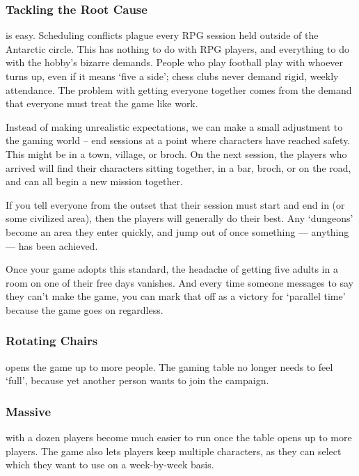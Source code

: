 \begin{multicols}{2}
\subsubsection{Tackling the Root Cause}
is easy.
Scheduling conflicts plague every RPG session held outside of the Antarctic circle.
This has nothing to do with RPG players, and everything to do with the hobby's bizarre demands.
People who play football play with whoever turns up, even if it means `five a side'; chess clubs never demand rigid, weekly attendance.
The problem with getting everyone together comes from the demand that everyone must treat the game like work.

Instead of making unrealistic expectations, we can make a small adjustment to the gaming world -- end sessions at a point where characters have reached safety.
This might be in a town, \gls{village}, or \gls{broch}.
On the next session, the players who arrived will find their characters sitting together, in a bar, \gls{broch}, or on the road, and can all begin a new mission together.

If you tell everyone from the outset that their session must start and end in  (or some civilized area), then the players will generally do their best.
Any `dungeons' become an area they enter quickly, and jump out of once something --- anything --- has been achieved.

Once your game adopts this standard, the headache of getting five adults in a room on one of their free days vanishes.
And every time someone messages to say they can't make the game, you can mark that off as a victory for `parallel time' because the game goes on regardless.

\subsubsection{Rotating Chairs}
opens the game up to more people.
The gaming table no longer needs to feel `full', because yet another person wants to join the \gls{campaign}.

\subsubsection{Massive }
with a dozen players become much easier to run once the table opens up to more players.
The game also lets players keep multiple characters, as they can select which they want to use on a week-by-week basis.


\end{multicols}
